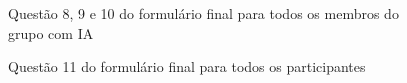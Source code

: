 \documentclass[english,brazilian]{UNISINOSartigo} %
\begin{document}
\begin{figure}[ht]
    \caption{Questão 8, 9 e 10 do formulário final para todos os membros do grupo com IA}
    \label{fig:questao8_9_10_com_ia}
    \centering
    \footnotesize
    \begin{minipage}{.9\textwidth}
        \centering
    \end{minipage}
\end{figure}
\FloatBarrier

\begin{figure}[ht]
    \caption{Questão 11 do formulário final para todos os participantes}
    \label{fig:questao11_geral}
    \centering
    \footnotesize
    \begin{minipage}{.9\textwidth}
        \centering
    \end{minipage}
\end{figure}
\FloatBarrier
\end{document}
